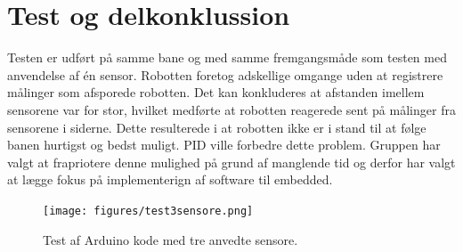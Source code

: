 \section{Test og delkonklussion}
Testen er udført på samme bane og med samme fremgangsmåde som testen med anvendelse af én sensor. Robotten foretog adskellige omgange uden at registrere målinger som afsporede robotten. Det kan konkluderes at afstanden imellem sensorene var for stor, hvilket medførte at robotten reagerede sent på målinger fra sensorene i siderne. Dette resulterede i at robotten ikke er i stand til at følge banen hurtigst og bedst muligt. 
PID ville forbedre dette problem. Gruppen har valgt at frapriotere denne mulighed på grund af manglende tid og derfor har valgt at lægge fokus på implementerign af software til embedded. 



\begin{figure}[h!]
  \centering
  \texttt{[image: figures/test3sensore.png]}
  \caption{Test af Arduino kode med tre anvedte sensore.}
  \label{test_3_sensore}
\end{figure}










